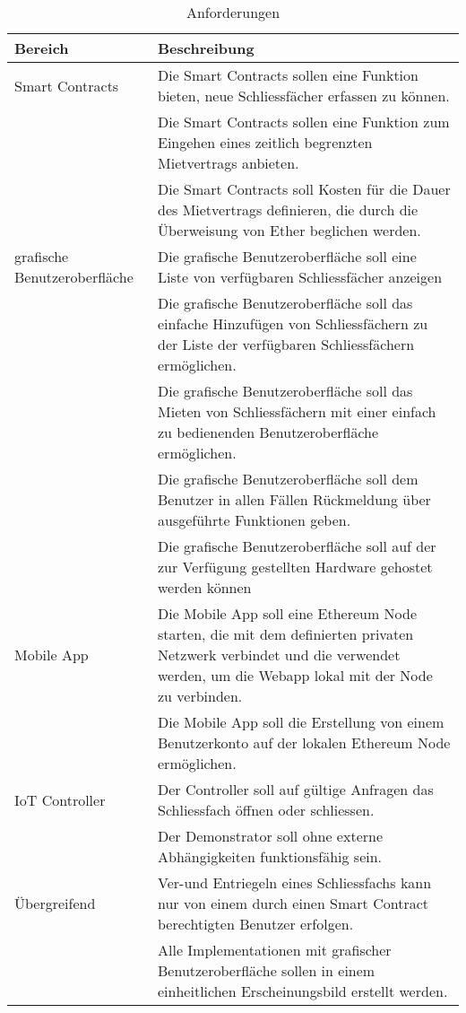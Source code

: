 \begin{table}[H]
\centering
\caption{Anforderungen}
\label{tbl:Anforderungen}
\begin{tabular}{@{}L{3cm}L{10cm}@{}}
\toprule
Bereich & Beschreibung \\ \midrule
Smart Contracts & Die Smart Contracts sollen eine Funktion bieten, neue Schliessfächer erfassen zu
können. \\ \midrule
 & Die Smart Contracts sollen eine Funktion zum Eingehen eines zeitlich begrenzten
Mietvertrags anbieten. \\ \midrule
 & Die Smart Contracts soll Kosten für die Dauer des Mietvertrags definieren, die durch die Überweisung von Ether beglichen werden.\\ \midrule
grafische Benutzeroberfläche & Die grafische Benutzeroberfläche soll eine Liste von verfügbaren Schliessfächer anzeigen \\ \midrule
 & Die grafische Benutzeroberfläche soll das einfache Hinzufügen von Schliessfächern zu der Liste der verfügbaren Schliessfächern ermöglichen. \\ \midrule
 & Die grafische Benutzeroberfläche soll das Mieten von Schliessfächern mit einer einfach zu bedienenden Benutzeroberfläche ermöglichen. \\ \midrule
 & Die grafische Benutzeroberfläche soll dem Benutzer in allen Fällen Rückmeldung über ausgeführte Funktionen geben. \\ \midrule
 & Die grafische Benutzeroberfläche soll auf der zur Verfügung gestellten Hardware gehostet werden können \\ \midrule
Mobile App & Die Mobile App soll eine Ethereum Node starten, die mit dem definierten privaten Netzwerk verbindet und die verwendet werden, um die Webapp lokal mit der Node zu verbinden. \\ \midrule
 & Die Mobile App soll die Erstellung von einem Benutzerkonto auf der lokalen Ethereum Node ermöglichen. \\ \midrule
IoT Controller & Der Controller soll auf gültige Anfragen das Schliessfach öffnen oder schliessen. \\ \midrule
 & Der Demonstrator soll ohne externe Abhängigkeiten funktionsfähig sein. \\ \midrule
Übergreifend & Ver-und Entriegeln eines Schliessfachs kann nur von einem durch einen Smart Contract berechtigten Benutzer erfolgen. \\
 & Alle Implementationen mit grafischer Benutzeroberfläche sollen in einem einheitlichen Erscheinungsbild erstellt werden. \\ \bottomrule
\end{tabular}
\end{table}


